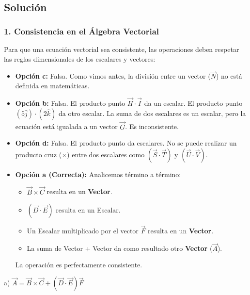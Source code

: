 \documentclass[12pt, a4paper]{article}
\begin{document}
\subsection*{Solución}

\subsubsection*{1. Consistencia en el Álgebra Vectorial}
Para que una ecuación vectorial sea consistente, las operaciones deben respetar las reglas dimensionales de los escalares y vectores:
\begin{itemize}
    \item \textbf{Opción c:} Falsa. Como vimos antes, la división entre un vector ($\vec{N}$) no está definida en matemáticas.
    \item \textbf{Opción b:} Falsa. El producto punto $\vec{H} \cdot \vec{I}$ da un escalar. El producto punto $(5\hat{j}) \cdot (2\hat{k})$ da otro escalar. La suma de dos escalares es un escalar, pero la ecuación está igualada a un vector $\vec{G}$. Es inconsistente.
    \item \textbf{Opción d:} Falsa. El producto punto da escalares. No se puede realizar un producto cruz ($\times$) entre dos escalares como $(\vec{S} \cdot \vec{T})$ y $(\vec{U} \cdot \vec{V})$. 
    \item \textbf{Opción a (Correcta):} Analicemos término a término:
    \begin{itemize}
        \item $\vec{B} \times \vec{C}$ resulta en un \textbf{Vector}.
        \item $(\vec{D} \cdot \vec{E})$ resulta en un Escalar.
        \item Un Escalar multiplicado por el vector $\vec{F}$ resulta en un \textbf{Vector}.
        \item La suma de Vector + Vector da como resultado otro \textbf{Vector} ($\vec{A}$).
    \end{itemize}
    La operación es perfectamente consistente.
\end{itemize}

\begin{tcolorbox}[colback=green!5!white, colframe=green!50!black, title=Respuesta Final]
\centering \Large a) $\vec{A} = \vec{B} \times \vec{C} + (\vec{D} \cdot \vec{E})\vec{F}$
\end{tcolorbox}

\newpage

\end{document}
